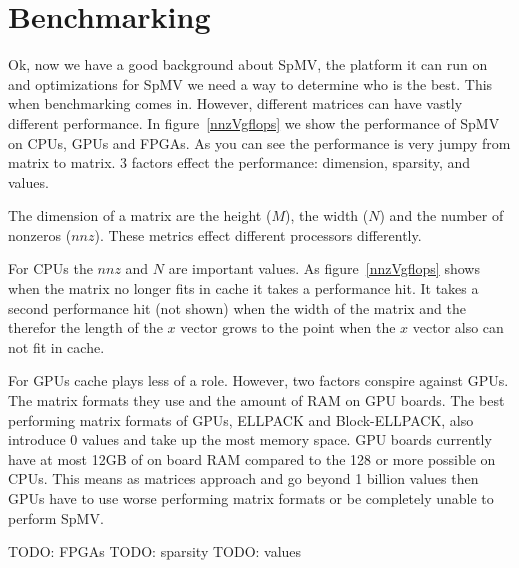\section{Benchmarking}
Ok, now we have a good background about SpMV, the platform it can run on and optimizations for SpMV we need a way to determine who is the best. This when benchmarking comes in. However, different matrices can have vastly different performance. In figure~\ref{nnzVgflops} we show the performance of SpMV on CPUs, GPUs and FPGAs. As you can see the performance is very jumpy from matrix to matrix. 3 factors effect the performance: dimension, sparsity, and values. \par
The dimension of a matrix are the height ($M$), the width ($N$) and the number of nonzeros ($nnz$). These metrics effect different processors differently. \par
For CPUs the $nnz$ and $N$ are important values. As figure~\ref{nnzVgflops} shows when the matrix no longer fits in cache it takes a performance hit. It takes a second performance hit (not shown) when the width of the matrix and the therefor the length of the $x$ vector grows to the point when the $x$ vector also can not fit in cache. \par
For GPUs cache plays less of a role. However, two factors conspire against GPUs. The matrix formats they use and the amount of RAM on GPU boards. The best performing matrix formats of GPUs, ELLPACK and Block-ELLPACK, also introduce 0 values and take up the most memory space. GPU boards currently have at most 12GB of on board RAM compared to the 128 or more possible on CPUs. This means as matrices approach and go beyond 1 billion values then GPUs have to use worse performing matrix formats or be completely unable to perform SpMV. \par
TODO: FPGAs
TODO: sparsity
TODO: values
